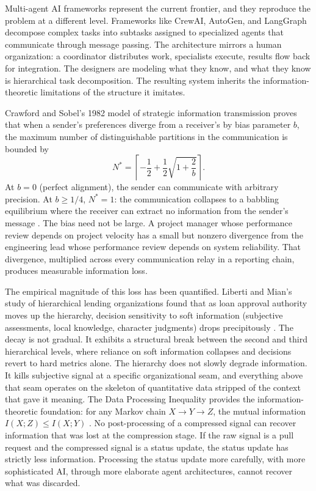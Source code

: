 \documentclass[11pt,a4paper]{article}
\begin{document}
Multi-agent AI frameworks represent the current frontier, and they reproduce the problem at a different level. Frameworks like CrewAI, AutoGen, and LangGraph decompose complex tasks into subtasks assigned to specialized agents that communicate through message passing. The architecture mirrors a human organization: a coordinator distributes work, specialists execute, results flow back for integration. The designers are modeling what they know, and what they know is hierarchical task decomposition. The resulting system inherits the information-theoretic limitations of the structure it imitates.

Crawford and Sobel's 1982 model of strategic information transmission proves that when a sender's preferences diverge from a receiver's by bias parameter $b$, the maximum number of distinguishable partitions in the communication is bounded by
\begin{equation}
\label{eq:cs}
N^* = \left\lceil -\frac{1}{2} + \frac{1}{2}\sqrt{1 + \frac{2}{b}} \right\rceil.
\end{equation}
At $b = 0$ (perfect alignment), the sender can communicate with arbitrary precision. At $b \geq 1/4$, $N^* = 1$: the communication collapses to a babbling equilibrium where the receiver can extract no information from the sender's message \citep{crawford1982}. The bias need not be large. A project manager whose performance review depends on project velocity has a small but nonzero divergence from the engineering lead whose performance review depends on system reliability. That divergence, multiplied across every communication relay in a reporting chain, produces measurable information loss.

The empirical magnitude of this loss has been quantified. Liberti and Mian's study of hierarchical lending organizations found that as loan approval authority moves up the hierarchy, decision sensitivity to soft information (subjective assessments, local knowledge, character judgments) drops precipitously \citep{liberti2009}. The decay is not gradual. It exhibits a structural break between the second and third hierarchical levels, where reliance on soft information collapses and decisions revert to hard metrics alone. The hierarchy does not slowly degrade information. It kills subjective signal at a specific organizational seam, and everything above that seam operates on the skeleton of quantitative data stripped of the context that gave it meaning. The Data Processing Inequality provides the information-theoretic foundation: for any Markov chain $X \to Y \to Z$, the mutual information $I(X;Z) \leq I(X;Y)$ \citep{cover2006}. No post-processing of a compressed signal can recover information that was lost at the compression stage. If the raw signal is a pull request and the compressed signal is a status update, the status update has strictly less information. Processing the status update more carefully, with more sophisticated AI, through more elaborate agent architectures, cannot recover what was discarded.
\end{document}
